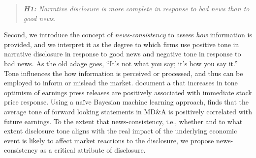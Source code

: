 \documentclass[letterpaper,11pt]{article}
\begin{document}
\begin{spacing}{1.5}
\begin{quote}
\textit{\textbf{H1:} Narrative disclosure is more complete in response to bad news than to good news.}
\end{quote}

Second, we introduce the concept of \textit{news-consistency} to assess \textit{how} information is provided, and we interpret it as the degree to which firms use positive tone in narrative disclosure in response to good news and negative tone in response to bad news. As the old adage goes, ``It's not what you say; it's how you say it.'' Tone influences the how information is perceived or processed, and thus can be employed to inform or mislead the market.  document a that increases in tone optimism of earnings press releases are positively associated with immediate stock price response. Using a naïve Bayesian machine learning approach,  finds that the average tone of forward looking statements in MD\&A is positively correlated with future earnings. To the extent that news-consistency, i.e., whether and to what extent disclosure tone aligns with the real impact of the underlying economic event is likely to affect market reactions to the disclosure, we propose news-consistency as a critical attribute of disclosure. 


\end{spacing}
\end{document}
